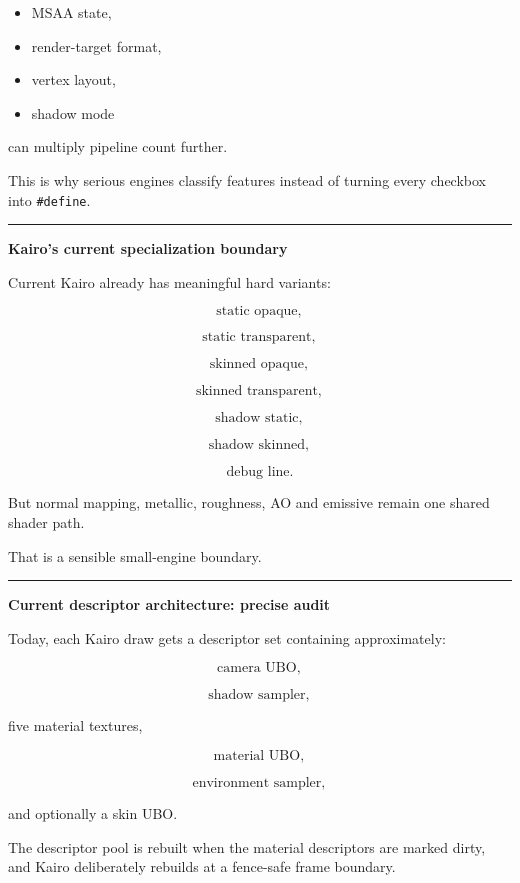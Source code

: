 \begin{itemize}
\tightlist
\item
  MSAA state,
\item
  render-target format,
\item
  vertex layout,
\item
  shadow mode
\end{itemize}

can multiply pipeline count further.

This is why serious engines classify features instead of turning every checkbox into \texttt{\#define}.

\begin{center}\rule{0.5\linewidth}{0.5pt}\end{center}

\textbf{Kairo's current specialization boundary}

Current Kairo already has meaningful hard variants:

\[
\text{static opaque},
\]

\[
\text{static transparent},
\]

\[
\text{skinned opaque},
\]

\[
\text{skinned transparent},
\]

\[
\text{shadow static},
\]

\[
\text{shadow skinned},
\]

\[
\text{debug line}.
\]

But normal mapping, metallic, roughness, AO and emissive remain one shared shader path.

That is a sensible small-engine boundary.

\begin{center}\rule{0.5\linewidth}{0.5pt}\end{center}

\textbf{Current descriptor architecture: precise audit}

Today, each Kairo draw gets a descriptor set containing approximately:

\[
\text{camera UBO},
\]

\[
\text{shadow sampler},
\]

five material textures,

\[
\text{material UBO},
\]

\[
\text{environment sampler},
\]

and optionally a skin UBO.

The descriptor pool is rebuilt when the material descriptors are marked dirty, and Kairo deliberately rebuilds at a fence-safe frame boundary.

